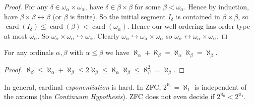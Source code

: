 \documentclass[a3paper, 10pt]{article}
\renewcommand{\vocab}[1]{\emph{#1}}
\begin{document}
\begin{multicols*}{5}
\begin{proof}
  For any $\delta \in \omega_\alpha \times \omega_\alpha$, have $\delta \in \beta \times \beta$ for some $\beta<\omega_\alpha$. Hence by induction, have $\beta \times \beta \leftrightarrow \beta$ (or $\beta$ is finite). So the initial segment $I_\delta$ is contained in $\beta \times \beta$, so $\operatorname{card}\left(I_\delta\right) \leq \operatorname{card}(\beta)<\operatorname{card}\left(\omega_\alpha\right)$. Hence our well-ordering has order-type at most $\omega_\alpha$. So $\omega_\alpha \times \omega_\alpha \hookrightarrow \omega_\alpha$. Clearly $\omega_\alpha \hookrightarrow \omega_\alpha \times \omega_\alpha$ so $\omega_\alpha \leftrightarrow \omega_\alpha \times \omega_\alpha$.
\end{proof}

\begin{corollary}
  For any ordinals $\alpha, \beta$ with $\alpha \leq \beta$ we have $\aleph_\alpha + \aleph_\beta = \aleph_\alpha \aleph_\beta = \aleph_\beta$. 
\end{corollary}
\begin{proof}
  $\aleph_\beta \leq \aleph_\alpha+\aleph_\beta \leq 2 \aleph_\beta \leq \aleph_\alpha \aleph_\beta \leq \aleph_\beta^2=\aleph_\beta$.
\end{proof}

In general, cardinal \emph{exponentiation} is hard. In ZFC, $2^{\aleph_0} = \aleph_1$ is independent of the axioms (the \vocab{Continuum Hypothesis}). 
ZFC does not even decide if $2^{\aleph_0} < 2^{\aleph_1}$.

\end{multicols*}
\end{document}
